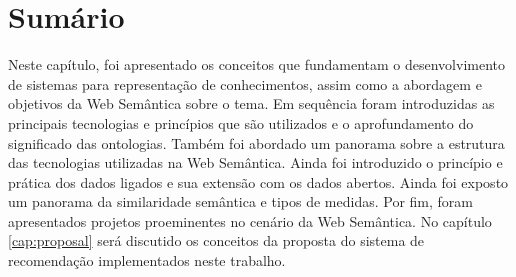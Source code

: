 \section{Sumário}

Neste capítulo, foi apresentado os conceitos que fundamentam o desenvolvimento de sistemas para representação de conhecimentos, assim como a abordagem e objetivos da Web Semântica sobre o tema. Em sequência foram introduzidas as principais tecnologias e princípios que são utilizados e o aprofundamento do significado das ontologias. Também foi abordado um panorama sobre a estrutura das tecnologias utilizadas na Web Semântica. Ainda foi introduzido o princípio e prática dos dados ligados e sua extensão com os dados abertos. Ainda foi exposto um panorama da similaridade semântica e tipos de medidas. Por fim, foram apresentados projetos proeminentes no cenário da Web Semântica. No capítulo \ref{cap:proposal} será discutido os conceitos da proposta do sistema de recomendação implementados neste trabalho.
